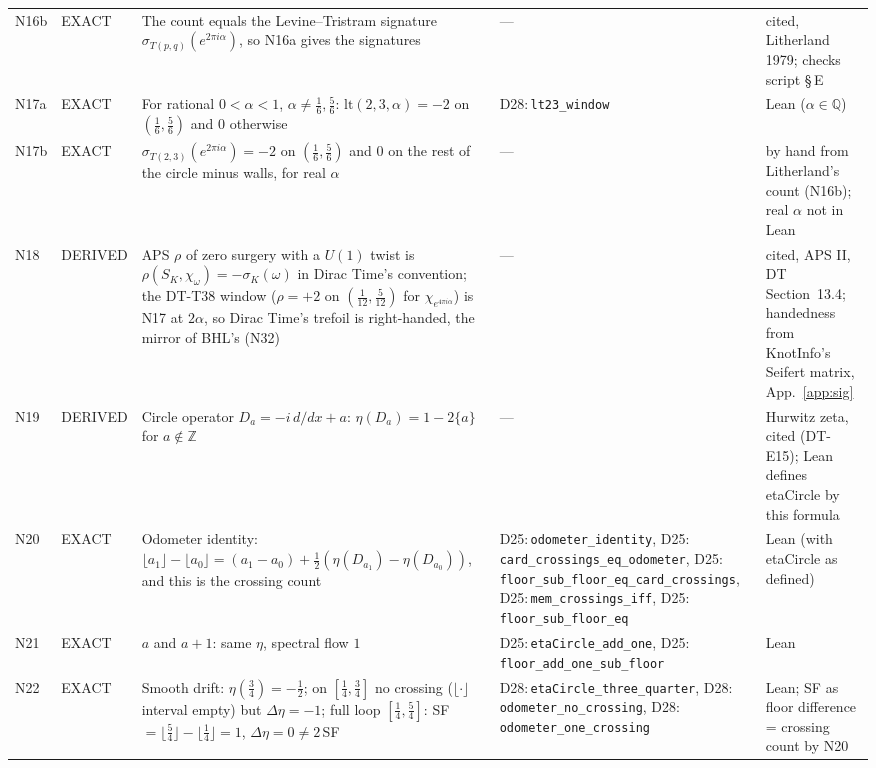 \documentclass[11pt]{article}
\theoremstyle{definition}
\newcommand{\lean}[1]{\texttt{\small #1}}
\begin{document}
{\begin{longtable}{@{}L{0.05\textwidth}L{0.12\textwidth}L{0.26\textwidth}L{0.27\textwidth}L{0.17\textwidth}@{}}
N16b & EXACT & The count equals the Levine--Tristram signature $\sigma_{T(p,q)}(e^{2\pi i\alpha})$, so N16a gives the signatures & --- & cited, Litherland 1979; checks script \S\,E\\
N17a & EXACT & For rational $0<\alpha<1$, $\alpha\ne\tfrac16,\tfrac56$: $\mathrm{lt}(2,3,\alpha)=-2$ on $(\tfrac16,\tfrac56)$ and $0$ otherwise & D28:\,\lean{lt23\_\allowbreak{}window} & Lean ($\alpha\in\mathbb Q$)\\
N17b & EXACT & $\sigma_{T(2,3)}(e^{2\pi i\alpha})=-2$ on $(\tfrac16,\tfrac56)$ and $0$ on the rest of the circle minus walls, for real $\alpha$ & --- & by hand from Litherland's count (N16b); real $\alpha$ not in Lean\\
N18 & DERIVED & APS $\rho$ of zero surgery with a $U(1)$ twist is $\rho(S_K,\chi_\omega)=-\sigma_K(\omega)$ in Dirac Time's convention; the DT-T38 window ($\rho=+2$ on $(\tfrac1{12},\tfrac5{12})$ for $\chi_{e^{4\pi i\alpha}}$) is N17 at $2\alpha$, so Dirac Time's trefoil is right-handed, the mirror of BHL's (N32) & --- & cited, APS II, DT Section~13.4; handedness from KnotInfo's Seifert matrix, App.~\ref{app:sig}\\
N19 & DERIVED & Circle operator $D_a=-i\,d/dx+a$: $\eta(D_a)=1-2\{a\}$ for $a\notin\mathbb Z$ & --- & Hurwitz zeta, cited (DT-E15); Lean defines etaCircle by this formula\\
N20 & EXACT & Odometer identity: $\lfloor a_1\rfloor-\lfloor a_0\rfloor=(a_1-a_0)+\tfrac12(\eta(D_{a_1})-\eta(D_{a_0}))$, and this is the crossing count & D25:\,\lean{odometer\_\allowbreak{}identity}, D25:\,\lean{card\_\allowbreak{}crossings\_\allowbreak{}eq\_\allowbreak{}odometer}, D25:\,\lean{floor\_\allowbreak{}sub\_\allowbreak{}floor\_\allowbreak{}eq\_\allowbreak{}card\_\allowbreak{}crossings}, D25:\,\lean{mem\_\allowbreak{}crossings\_\allowbreak{}iff}, D25:\,\lean{floor\_\allowbreak{}sub\_\allowbreak{}floor\_\allowbreak{}eq} & Lean (with etaCircle as defined)\\
N21 & EXACT & $a$ and $a+1$: same $\eta$, spectral flow $1$ & D25:\,\lean{etaCircle\_\allowbreak{}add\_\allowbreak{}one}, D25:\,\lean{floor\_\allowbreak{}add\_\allowbreak{}one\_\allowbreak{}sub\_\allowbreak{}floor} & Lean\\
N22 & EXACT & Smooth drift: $\eta(\tfrac34)=-\tfrac12$; on $[\tfrac14,\tfrac34]$ no crossing ($\lfloor\cdot\rfloor$ interval empty) but $\Delta\eta=-1$; full loop $[\tfrac14,\tfrac54]$: SF$=\lfloor\tfrac54\rfloor-\lfloor\tfrac14\rfloor=1$, $\Delta\eta=0\neq2\,$SF & D28:\,\lean{etaCircle\_\allowbreak{}three\_\allowbreak{}quarter}, D28:\,\lean{odometer\_\allowbreak{}no\_\allowbreak{}crossing}, D28:\,\lean{odometer\_\allowbreak{}one\_\allowbreak{}crossing} & Lean; SF as floor difference = crossing count by N20\\

\end{longtable}}
\end{document}
